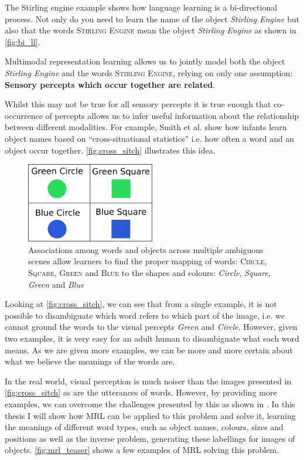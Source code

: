 The Stirling engine example shows how language learning is a bi-directional process. Not only do you need to learn the name of the object \textit{Stirling Engine} but also that the words \textsc{Stirling Engine} mean the object \textit{Stirling Engine} as shown in \autoref{fig:bi_ll}. 

Multimodal representation learning allows us to jointly model both the object \textit{Stirling Engine} and the words \textsc{Stirling Engine}, relying on only one assumption: \textbf{Sensory percepts which occur together are related}.

Whilst this may not be true for all sensory percepts it is true enough that co-occurrence of percepts allows us to infer useful information about the relationship between different modalities. For example, Smith et al. \cite{smith2008infants} show how infants learn object names based on ``cross-situational statistics'' i.e. how often a word and an object occur together. \autoref{fig:cross_sitch} illustrates this idea.

\begin{figure}[h]
\centering
\includegraphics[width=0.5\textwidth]{Figs/introduction/shapes.png}
\caption{Associations among words and objects across multiple ambiguous scenes allow learners to find the proper mapping of words:
\textsc{Circle}, \textsc{Square}, \textsc{Green} and \textsc{Blue} to the shapes and colours: \textit{Circle},  \textit{Square},  \textit{Green} and \textit{Blue}}
\label{fig:cross_sitch}
\end{figure}

Looking at \autoref{fig:cross_sitch}, we can see that from a single example, it is not possible to disambiguate which word refers to which part of the image, i.e. we cannot ground the words  to the visual percepts \textit{Green} and \textit{Circle}. However, given two examples, it is very easy for an adult human to disambiguate what each word means. As we are given more examples, we can be more and more certain about what we believe the meanings of the words are. 

In the real world, visual perception is much noiser than the images presented in \autoref{fig:cross_sitch} as are the utterances of words. However, by providing more examples, we can overcome the challenges presented by this as shown in \cite{yurovsky2013statistical}. In this thesis I will show how \ac{MRL} can be applied to this problem and solve it, learning the meanings of different word types, such as object names, colours, sizes and positions as well as the inverse problem, generating these labellings for images of objects. \autoref{fig:mrl_teaser} shows a few examples of \ac{MRL} solving this problem.

